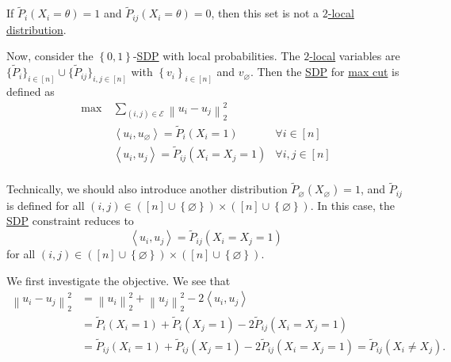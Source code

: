 \begin{eg}
	If \(\widetilde{P} _i (X_i = \theta ) = 1\) and \(\widetilde{P} _{ij}(X_i = \theta ) = 0\), then this set is not a \hyperref[def:2-local-distribution]{\(2\)-local distribution}.
\end{eg}

Now, consider the \(\left\{ 0, 1 \right\} \)-\hyperref[def:SDP]{SDP} with local probabilities. The \hyperref[def:2-local-distribution]{\(2\)-local} variables are \(\{ \widetilde{P} _i \} _{i\in [n]} \cup  \{ \widetilde{P} _{ij} \}_{i, j\in [n]} \) with \(\left\{ v_i \right\} _{i\in [n]}\) and \(v_\varnothing \). Then the \hyperref[def:SDP]{SDP} for \hyperref[prb:max-cut]{max cut} is defined as
\[
	\begin{aligned}
		\max~ & \sum_{(i, j)\in \mathcal{E} }\left\lVert u_i - u_j\right\rVert _2^2                              \\
		      & \left\langle u_i, u_\varnothing  \right\rangle = \widetilde{P} _i(X_i = 1) & \forall i\in [n]    \\
		      & \left\langle u_i, u_j  \right\rangle = \widetilde{P} _{ij}(X_i = X_j = 1)  & \forall i, j\in [n] \\
	\end{aligned}
\]

\begin{remark}
	Technically, we should also introduce another distribution \(\widetilde{P} _{\varnothing }(X_\varnothing) = 1\), and \(\widetilde{P} _{ij}\) is defined for all \((i, j)\in ([n]\cup \left\{ \varnothing  \right\} )\times ([n]\cup \left\{ \varnothing  \right\} )\). In this case, the \hyperref[def:SDP]{SDP} constraint reduces to
	\[
		\left\langle  u_i, u_j \right\rangle = \widetilde{P} _{ij}(X_{i} = X_{j} =1)
	\]
	for all \((i, j)\in ([n]\cup \left\{ \varnothing  \right\} )\times ([n]\cup \left\{ \varnothing \right\} )\).
\end{remark}

We first investigate the objective. We see that
\[
	\begin{split}
		\left\lVert u_i - u_j\right\rVert _2^2
		 & = \left\lVert u_i\right\rVert _2^2 + \left\lVert u_j\right\rVert _2^2 - 2\left\langle u_{i} , u_{j}  \right\rangle \\
		 & = \widetilde{P} _i(X_i = 1)+ \widetilde{P} _i(X_j = 1) - 2 \widetilde{P} _{ij} ( X_i = X_j = 1)                    \\
		 & = \widetilde{P} _{ij}(X_i = 1)+ \widetilde{P} _{ij}(X_j = 1) - 2 \widetilde{P} _{ij} ( X_i = X_j = 1)
		= \widetilde{P} _{ij} ( X_i \neq X_j).
	\end{split}
\]

